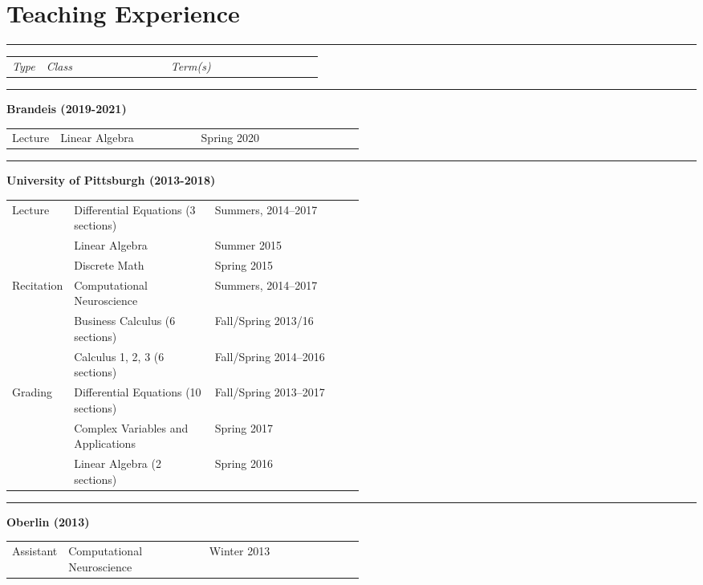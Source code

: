 \documentclass[a4paper,11pt]{article}
\begin{document}
\newpage

\section{Teaching Experience}

\noindent\rule{15cm}{0.4pt}

\begin{tabular}{p{0.11\linewidth}p{0.4\linewidth}p{.3\linewidth}}
	\textit{Type} & \textit{Class} & \textit{Term(s)}\\
\end{tabular}

\noindent\rule{15cm}{0.4pt}

\textbf{Brandeis (2019-2021)}

\begin{tabular}{p{0.11\linewidth}p{0.4\linewidth}p{.3\linewidth}}
	{Lecture} & Linear Algebra & Spring 2020
\end{tabular}

\noindent\rule{15cm}{0.4pt}

\textbf{University of Pittsburgh (2013-2018)}

\begin{tabular}{p{0.11\linewidth}p{0.4\linewidth}p{.3\linewidth}}
	 Lecture & Differential Equations (3 sections) & Summers, 2014--2017\\
	 & Linear Algebra & Summer 2015 \\
	 & Discrete Math & Spring 2015 \\
	 Recitation & Computational Neuroscience & Summers, 2014--2017 \\
	  & Business Calculus (6 sections) & Fall/Spring 2013/16\\
	  & Calculus 1, 2, 3 (6 sections) & Fall/Spring 2014--2016\\
	 Grading & Differential Equations (10 sections) & Fall/Spring 2013--2017  \\
	 & Complex Variables and Applications & Spring 2017 \\
	 & Linear Algebra (2 sections) & Spring 2016
\end{tabular}

\noindent\rule{15cm}{0.4pt}

\textbf{Oberlin (2013)}

\begin{tabular}{p{0.11\linewidth}p{0.4\linewidth}p{.2\linewidth}}
	 Assistant & Computational Neuroscience  & Winter 2013 
\end{tabular}
\end{document}
